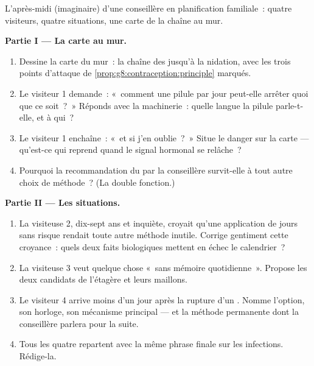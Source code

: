 \begin{problem}\label{pb:g8:contraception:1}
L'après-midi (imaginaire) d'une conseillère en planification
familiale~: quatre visiteurs, quatre situations, une carte de la
chaîne au mur.

\medskip\noindent\textbf{Partie I --- La carte au
mur.}
\begin{enumerate}
  \item Dessine la carte du mur~: la chaîne des  jusqu'à la
        nidation, avec les trois points d'attaque de
        \cref{prop:g8:contraception:principle} marqués.
  \item Le visiteur 1 demande~: «~comment une pilule par jour
        peut-elle arrêter quoi que ce soit~?~» Réponds avec la
        machinerie~: quelle langue la pilule parle-t-elle, et à qui~?
  \item Le visiteur 1 enchaîne~: «~et si j'en oublie~?~» Situe le
        danger sur la carte --- qu'est-ce qui reprend quand le
        signal hormonal se relâche~?
  \item Pourquoi la recommandation du  par la conseillère
        survit-elle à tout autre choix de méthode~? (La double
        fonction.)
\end{enumerate}

\medskip\noindent\textbf{Partie II --- Les situations.}
\begin{enumerate}[resume]
  \item La visiteuse 2, dix-sept ans et inquiète, croyait qu'une
        application de jours sans risque rendait toute autre méthode
        inutile. Corrige gentiment cette croyance~: quels deux faits
        biologiques mettent en échec le calendrier~?
  \item La visiteuse 3 veut quelque chose «~sans mémoire
        quotidienne~». Propose les deux candidats de l'étagère et
        leurs maillons.
  \item Le visiteur 4 arrive moins d'un jour après la rupture d'un
        . Nomme l'option, son horloge, son mécanisme
        principal --- et la méthode permanente dont la conseillère
        parlera pour la suite.
  \item Tous les quatre repartent avec la même phrase finale sur les
        infections. Rédige-la.
\end{enumerate}


\end{problem}

